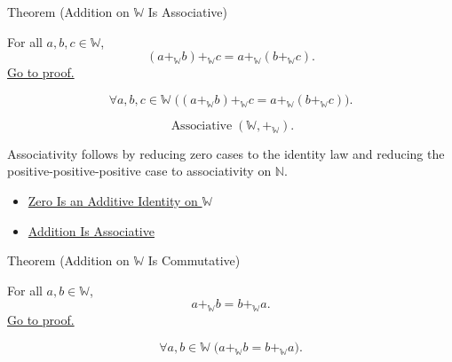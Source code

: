 \begin{theorembox}{Theorem (Addition on \texorpdfstring{$\mathbb{W}$}{W} Is Associative)}
\begin{theorem}
\label{thm:addition-on-w-associative}
For all $a,b,c\in\mathbb{W}$,
\[
(a+_{\mathbb{W}}b)+_{\mathbb{W}}c
=
a+_{\mathbb{W}}(b+_{\mathbb{W}}c).
\]
\hyperref[prf:addition-on-w-associative]{Go to proof.}
\end{theorem}
\end{theorembox}

\begin{remark*}
\[
\forall a,b,c\in\mathbb{W}\;
\bigl((a+_{\mathbb{W}}b)+_{\mathbb{W}}c
=a+_{\mathbb{W}}(b+_{\mathbb{W}}c)\bigr).
\]
\end{remark*}

\begin{remark*}
\[
\operatorname{Associative}(\mathbb{W},+_{\mathbb{W}}).
\]
\end{remark*}

\begin{remark*}[Interpretation]
Associativity follows by reducing zero cases to the identity law and reducing
the positive-positive-positive case to associativity on $\mathbb{N}$.
\end{remark*}

\begin{dependencies}
\begin{itemize}
  \item \hyperref[thm:zero-additive-identity-on-w]{Zero Is an Additive Identity on $\mathbb{W}$}
  \item \hyperref[thm:addition-associative]{Addition Is Associative}
\end{itemize}
\end{dependencies}

\begin{theorembox}{Theorem (Addition on \texorpdfstring{$\mathbb{W}$}{W} Is Commutative)}
\begin{theorem}
\label{thm:addition-on-w-commutative}
For all $a,b\in\mathbb{W}$,
\[
a+_{\mathbb{W}}b=b+_{\mathbb{W}}a.
\]
\hyperref[prf:addition-on-w-commutative]{Go to proof.}
\end{theorem}
\end{theorembox}

\begin{remark*}
\[
\forall a,b\in\mathbb{W}\;
\bigl(a+_{\mathbb{W}}b=b+_{\mathbb{W}}a\bigr).
\]
\end{remark*}

